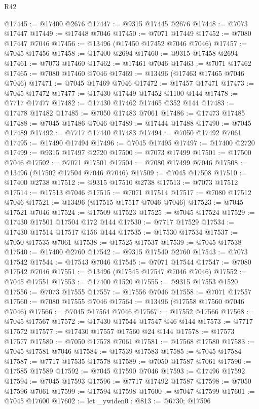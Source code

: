 \begin{lexlean}{R42}
\begin{coremodule}
{@17445 := @17400 @2676
@17447 := @9315 @17445 @2676
@17448 := @7073 @17447
@17449 := @17448 @7046
@17450 := @7071 @17449
@17452 := @7080 @17447 @7046
@17456 := @13496 (@17450 @17452 @7046 @7046)
@17457 := @7045 @17456
@17458 := @17400 @2694
@17460 := @9315 @17458 @2694
@17461 := @7073 @17460
@17462 := @17461 @7046
@17463 := @7071 @17462
@17465 := @7080 @17460 @7046
@17469 := @13496 (@17463 @17465 @7046 @7046)
@17471 := @7045 @17469 @7046
@17472 := @17457 @17471
@17473 := @7045 @17472
@17477 := @17430 @17449 @17452 @1100 @144
@17478 := @7717 @17477
@17482 := @17430 @17462 @17465 @352 @144
@17483 := @17478 @17482
@17485 := @7050 @17483 @7061
@17486 := @17473 @17485
@17488 := @7045 @17486 @7046
@17489 := @17444 @17488
@17490 := @7045 @17489
@17492 := @7717 @17440 @17483
@17494 := @7050 @17492 @7061
@17495 := @17490 @17494
@17496 := @7045 @17495
@17497 := @17400 @2720
@17499 := @9315 @17497 @2720
@17500 := @7073 @17499
@17501 := @17500 @7046
@17502 := @7071 @17501
@17504 := @7080 @17499 @7046
@17508 := @13496 (@17502 @17504 @7046 @7046)
@17509 := @7045 @17508
@17510 := @17400 @2738
@17512 := @9315 @17510 @2738
@17513 := @7073 @17512
@17514 := @17513 @7046
@17515 := @7071 @17514
@17517 := @7080 @17512 @7046
@17521 := @13496 (@17515 @17517 @7046 @7046)
@17523 := @7045 @17521 @7046
@17524 := @17509 @17523
@17525 := @7045 @17524
@17529 := @17430 @17501 @17504 @172 @144
@17530 := @7717 @17529
@17534 := @17430 @17514 @17517 @156 @144
@17535 := @17530 @17534
@17537 := @7050 @17535 @7061
@17538 := @17525 @17537
@17539 := @7045 @17538
@17540 := @17400 @2760
@17542 := @9315 @17540 @2760
@17543 := @7073 @17542
@17544 := @17543 @7046
@17545 := @7071 @17544
@17547 := @7080 @17542 @7046
@17551 := @13496 (@17545 @17547 @7046 @7046)
@17552 := @7045 @17551
@17553 := @17400 @1520
@17555 := @9315 @17553 @1520
@17556 := @7073 @17555
@17557 := @17556 @7046
@17558 := @7071 @17557
@17560 := @7080 @17555 @7046
@17564 := @13496 (@17558 @17560 @7046 @7046)
@17566 := @7045 @17564 @7046
@17567 := @17552 @17566
@17568 := @7045 @17567
@17572 := @17430 @17544 @17547 @46 @144
@17573 := @7717 @17572
@17577 := @17430 @17557 @17560 @24 @144
@17578 := @17573 @17577
@17580 := @7050 @17578 @7061
@17581 := @17568 @17580
@17583 := @7045 @17581 @7046
@17584 := @17539 @17583
@17585 := @7045 @17584
@17587 := @7717 @17535 @17578
@17589 := @7050 @17587 @7061
@17590 := @17585 @17589
@17592 := @7045 @17590 @7046
@17593 := @17496 @17592
@17594 := @7045 @17593
@17596 := @7717 @17492 @17587
@17598 := @7050 @17596 @7061
@17599 := @17594 @17598
@17600 := @7047 @17599
@17601 := @7045 @17600
@17602 := let _ywiden0 : @813 := @6730; @17596
}
\end{coremodule}
\end{lexlean}
